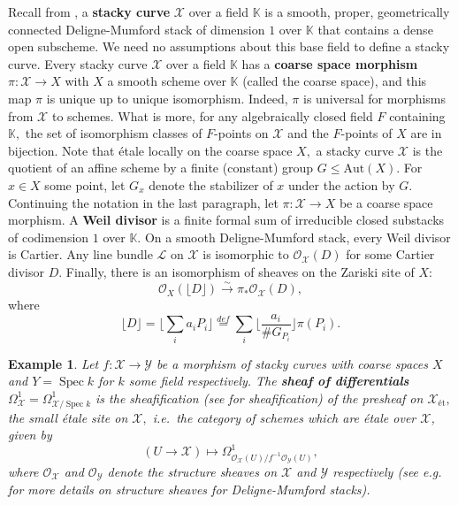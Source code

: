 \documentclass[11pt]{amsart}
\newtheorem{example}[theorem]{Example}
\theoremstyle{definition}
\numberwithin{equation}{section}
\newcommand{\Aut}{\mathrm{Aut}} 	%
\newcommand{\Spec}{\operatorname{Spec}} 	%
\newcommand{\cO}{\mathcal{O}}		%
\newcommand{\sL}{\mathscr{L}}		%
\newcommand{\sX}{\mathscr{X}}		%
\newcommand{\sY}{\mathscr{Y}}		%
\newcommand{\bbK}{\mathbb{K}}		%
\begin{document}
		Recall from \cite[Sections $5.2$ and $5.3$]{VZB}, a \textbf{stacky curve} $\sX$ over a field $\bbK$ is a smooth, proper, geometrically connected Deligne-Mumford stack of dimension $1$ over $\bbK$ that contains a dense open subscheme. We need no assumptions about this base field to define a stacky curve. Every stacky curve $\sX$ over a field $\bbK$ has a \textbf{coarse space morphism} $\pi:\sX\to X$ with $X$ a smooth scheme over $\bbK$ (called the coarse space), and this map $\pi$ is unique up to unique isomorphism. Indeed, $\pi$ is universal for morphisms from $\sX$ to schemes. What is more, for any algebraically closed field $F$ containing $\bbK,$ the set of isomorphism classes of $F$-points on $\sX$ and the $F$-points of $X$ are in bijection. Note that \'etale locally on the coarse space $X,$ a stacky curve $\sX$ is the quotient of an affine scheme by a finite (constant) group $G\leq \Aut(X).$ For $x\in X$ some point, let $G_x$ denote the stabilizer of $x$ under the action by $G.$\\
		
		Continuing the notation in the last paragraph, let $\pi:\sX\to X$ be a coarse space morphism. A \textbf{Weil divisor} is a finite formal sum of irreducible closed substacks of codimension $1$ over $\bbK.$ On a smooth Deligne-Mumford stack, every Weil divisor is Cartier. Any line bundle $\sL$ on $\sX$ is isomorphic to $\cO_{\sX}(D)$ for some Cartier divisor $D.$ Finally, there is an isomorphism of sheaves on the Zariski site of $X:$
		\[ \cO_X(\lfloor D \rfloor)\overset{\sim}{\to}\pi_*\cO_{\sX}(D), \]
		where \[\lfloor D\rfloor=\Big\lfloor\sum_ia_iP_i\Big\rfloor\overset{def}{=}\sum_i\Big\lfloor\frac{a_i}{\#G_{P_i}}\Big\rfloor\pi(P_i).\]
		
		\begin{example}\label{ex: sheaf of differentials}
			Let $f:\sX\to \sY$ be a morphism of stacky curves with coarse spaces $X$ and $Y=\Spec k$ for $k$ some field respectively. The \textbf{sheaf of differentials} $\Omega^1_{\sX}=\Omega^1_{\sX/\Spec k}$ is the sheafification (see \cite[Section $2.2.3$]{Alper-Stacks-and-Moduli} for sheafification) of the presheaf on $\sX_{\text{\'et}},$ the small \'etale site on $\sX,$ i.e.\ the category of schemes which are \'etale over $\sX$, given by 
			\[ (U\to \sX)\mapsto \Omega^1_{\cO_{\sX}(U)/f^{-1}\cO_{\sY}(U)},\]
			where $\cO_{\sX}$ and $\cO_{\sY}$ denote the structure sheaves on $\sX$ and $\sY$ respectively (see e.g.\ \cite[Example $4.1.2$]{Alper-Stacks-and-Moduli} for more details on structure sheaves for Deligne-Mumford stacks). 
		\end{example}
		
\end{document}
